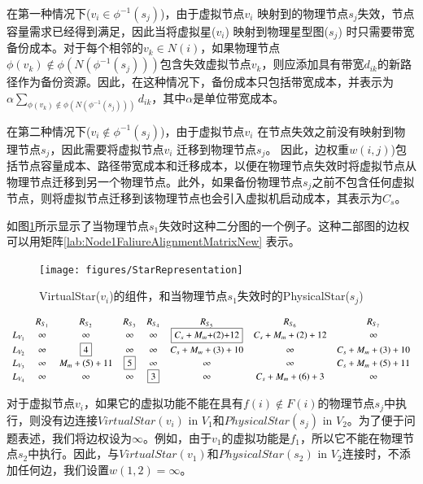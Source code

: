 在第一种情况下(${v_i} \in {\phi ^{ - 1}}({s_j})$)，由于虚拟节点$v_i$ 映射到的物理节点$s_j$失效，节点容量需求已经得到满足，因此当将虚拟星($v_i$) 映射到物理星型图($s_j$) 时只需要带宽备份成本。对于每个相邻的$v_k \in N(i)$，如果物理节点${\phi ({v_k}) \notin \phi (N({\phi ^{ - 1}}({s_j})))}$包含失效虚拟节点$v_k$，则应添加具有带宽$d_{ik}$的新路径作为备份资源。因此，在这种情况下，备份成本只包括带宽成本，并表示为$ { \alpha \sum\limits_{\phi ({v_k}) \notin \phi (N({\phi ^{ - 1}}({s_j})))} {{d_{ik}}} }$，其中$\alpha$是单位带宽成本。

在第二种情况下(${v_i} \notin {\phi ^{ - 1}}({s_j})$)，由于虚拟节点$v_i$ 在节点失效之前没有映射到物理节点$s_j$，因此需要将虚拟节点$v_i$ 迁移到物理节点$s_j$。 因此，边权重$w(i,j)$)包括节点容量成本、路径带宽成本和迁移成本，以便在物理节点失效时将虚拟节点从物理节点迁移到另一个物理节点。此外，如果备份物理节点$s_j$之前不包含任何虚拟节点，则将虚拟节点迁移到该物理节点也会引入虚拟机启动成本，其表示为$C_s$。

如图\ref{fig:StarRepresentation}所示显示了当物理节点$s_1$失效时这种二分图的一个例子。这种二部图的边权可以用矩阵\ref{lab:Node1FaliureAlignmentMatrixNew} 表示。
\begin{figure}
\centering
\texttt{[image: figures/StarRepresentation]}\\
  \caption{VirtualStar($v_i$)的组件，和当物理节点$s_1$失效时的PhysicalStar($s_j$)}\label{fig:StarRepresentation}
\end{figure}

\begin{equation*}
\small{
 {\begin{array}{*{20}{c}}
&R_{S_{1}}&R_{S_{2}}&R_{S_3}&R_{S_4}&R_{S_5}&R_{S_6}&R_{S_{7}}\\
{L_{V_1}}&\infty&\infty&\infty&\infty&\fbox{$C_{s}+M_{m}$+(2)+12}&C_{s}+M_{m}+(2)+12&\infty\\
L_{V_2}&\infty&\fbox{4}&\infty&\infty&C_{s}+M_{m}+(3)+10&\infty&C_{s}+M_{m}+(3)+10\\
L_{V_3}&\infty&M_{m}+(5)+11&\fbox{5}&\infty&\infty&\infty&C_{s}+M_{m}+(5)+11\\
L_{V_4}&\infty&\infty&\infty&\fbox{3}&\infty&C_{s}+M_{m}+(6)+3&\infty\\
\end{array}}
}
\label{lab:Node1FaliureAlignmentMatrixNew}
\end{equation*}


对于虚拟节点$v_i$，如果它的虚拟功能不能在具有$f(i) \notin F(i)$的物理节点$s_j$中执行，则没有边连接$VirtualStar(v_i)$ in $V_1$和$PhysicalStar(s_j)$ in $V_2$。为了便于问题表述，我们将边权设为$\infty $。例如，由于$v_1$的虚拟功能是$f_1$，所以它不能在物理节点$s_2$中执行。因此，与$VirtualStar(v_1)$和$PhysicalStar(s_2)$ in $V_2$连接时，不添加任何边，我们设置$w(1,2)=\infty$。

